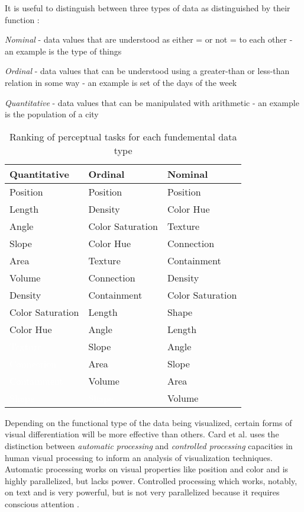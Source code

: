 It is useful to distinguish between three types of data as distinguished by their function \cite{card1997}:
\begin{description}
\item \emph{Nominal} - data values that are understood as either = or not = to each other - an example is the type of things 
\item \emph{Ordinal} - data values that can be understood using a greater-than or less-than relation in some way - an example is set of the days of the week
\item \emph{Quantitative} - data values that can be manipulated with arithmetic - an example is the population of a city 
\end{description}

\begin{table}
    \begin{center}
    \begin{tabular}{ | l | l | l | }
    \hline
    Quantitative & Ordinal & Nominal \\ \hline
    Position & Position & Position \\
    Length & Density & Color Hue \\
    Angle & Color Saturation & Texture \\
    Slope & Color Hue & Connection \\
    Area & Texture & Containment \\
    Volume & Connection & Density \\
    Density & Containment & Color Saturation \\
    Color Saturation & Length & Shape \\
    Color Hue & Angle & Length \\
    \cellcolor{black}\textcolor{white}{Texture} & Slope & Angle \\
    \cellcolor{black}\textcolor{white}{Connection} & Area & Slope \\
    \cellcolor{black}\textcolor{white}{Containment} & Volume & Area \\
    \cellcolor{black}\textcolor{white}{Shape} & \cellcolor{black}\textcolor{white}{Shape} & Volume \\
    \hline
    \end{tabular}
    \end{center}
    \caption{Ranking of perceptual tasks for each fundemental data type}
    \label{tab:perceptual}
\end{table}

Depending on the functional type of the data being visualized, certain forms of visual differentiation will be more effective than others. Card et al. \cite{card1997} uses the distinction between \emph{automatic processing} and \emph{controlled processing} capacities in human visual processing to inform an analysis of visualization techniques. Automatic processing works on visual properties like position and color and is highly parallelized, but lacks power. Controlled processing which works, notably, on text and is very powerful, but is not very parallelized because it requires conscious attention \cite{controlauto1977}. 

